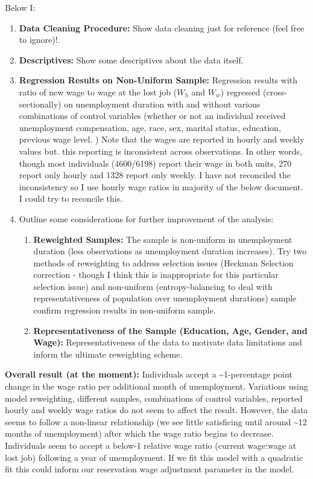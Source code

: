 \documentclass[
]{article}
\providecommand{\tightlist}{%
  \setlength{\itemsep}{0pt}\setlength{\parskip}{0pt}}
\begin{document}
Below I:

\begin{enumerate}
\def\labelenumi{\arabic{enumi}.}
\tightlist
\item
  \textbf{Data Cleaning Procedure:} Show data cleaning just for
  reference (feel free to ignore)!.
\item
  \textbf{Descriptives:} Show some descriptives about the data itself.
\item
  \textbf{Regression Results on Non-Uniform Sample:} Regression results
  with ratio of new wage to wage at the lost job (\(W_{h}\) and
  \(W_{w}\)) regressed (cross-sectionally) on unemployment duration with
  and without various combinations of control variables (whether or not
  an individual received unemployment compensation, age, race, sex,
  marital status, education, previous wage level. ) Note that the wages
  are reported in hourly and weekly values but. this reporting is
  inconsistent across observations. In other words, though most
  individuals (4600/6198) report their wage in both units, 270 report
  only hourly and 1328 report only weekly. I have not reconciled the
  inconsistency so I use hourly wage ratios in majority of the below
  document. I could try to reconcile this.
\item
  Outline some considerations for further improvement of the analysis:

  \begin{enumerate}
  \def\labelenumii{\arabic{enumii}.}
  \tightlist
  \item
    \textbf{Reweighted Samples:} The sample is non-uniform in
    unemployment duration (less observations as unemployment duration
    increases). Try two methods of reweighting to address selection
    issues (Heckman Selection correction - though I think this is
    inappropriate for this particular selection issue) and non-uniform
    (entropy-balancing to deal with representativeness of population
    over unemployment durations) sample confirm regression results in
    non-uniform sample.
  \item
    \textbf{Representativeness of the Sample (Education, Age, Gender,
    and Wage):} Representativeness of the data to motivate data
    limitations and inform the ultimate reweighting scheme.
  \end{enumerate}
\end{enumerate}

\textbf{Overall result (at the moment):} Individuals accept a
\textasciitilde1-percentage point change in the wage ratio per
additional month of unemployment. Variations using model reweighting,
different samples, combinations of control variables, reported hourly
and weekly wage ratios do not seem to affect the result. However, the
data seems to follow a non-linear relationship (we see little
satisficing until around \textasciitilde12 months of unemployment) after
which the wage ratio begins to decrease. Individuals seem to accept a
below-1 relative wage ratio (current wage:wage at lost job) following a
year of unemployment. If we fit this model with a quadratic fit this
could inform our reservation wage adjustment parameter in the model.
\end{document}
